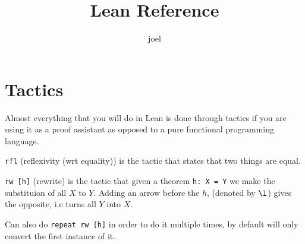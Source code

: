 \documentclass[10pt]{article}
\title{Lean Reference}
\author{joel}
\date{}
\theoremstyle{definition}
\theoremstyle{remark}
\begin{document}
\maketitle

\section{Tactics}

Almost everything that you will do in Lean is done through tactics if you are using 
it as a proof assistant as opposed to a pure functional programming language. 

\verb|rfl| (reflexivity (wrt equality)) is the tactic that states that two
things are equal. 

\verb|rw [h]| (rewrite) is the tactic that given a theorem \verb|h: X = Y| we
make the substituion of all $X$ to $Y$. Adding an arrow before the $h$,
(denoted by $\l$) gives the opposite, i.e turns all $Y$ into $X$. 

Can also do \verb|repeat rw [h]| in order to do it multiple times, by default
will only convert the first instance of it. 



\end{document}
